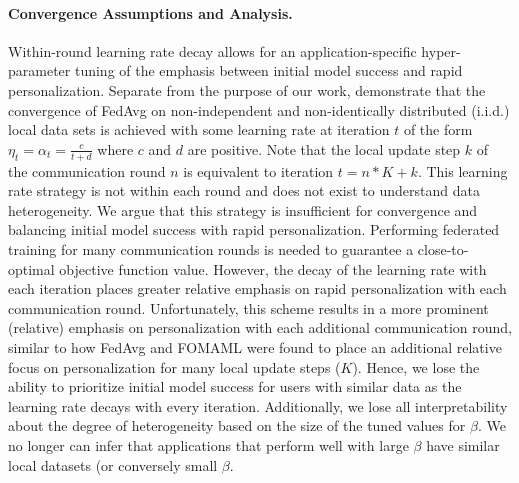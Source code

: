 \paragraph{Convergence Assumptions and Analysis.}
Within-round learning rate decay allows for an application-specific hyper-parameter tuning of the emphasis between initial model success and rapid personalization.
Separate from the purpose of our work,  \citet{fedavg-conv} demonstrate that the convergence of FedAvg on non-independent and non-identically distributed (i.i.d.) local data sets is achieved with some learning rate at iteration $t$ of the form $\eta_t = \alpha_t = \frac{c}{t + d}$ where $c$ and $d$ are positive. 
Note that the local update step $k$ of the communication round $n$ is equivalent to iteration $t = n * K + k$.
This learning rate strategy is not within each round and does not exist to understand data heterogeneity.
We argue that this strategy is insufficient for convergence and balancing initial model success with rapid personalization.
Performing federated training for many communication rounds is needed to guarantee a close-to-optimal objective function value.
However, the decay of the learning rate with each iteration places greater relative emphasis on rapid personalization with each communication round.
Unfortunately, this scheme results in a more prominent (relative) emphasis on personalization with each additional communication round, similar to how FedAvg and FOMAML were found to place an additional relative focus on personalization for many local update steps ($K$).
Hence, we lose the ability to prioritize initial model success for users with similar data as the learning rate decays with every iteration.
Additionally, we lose all interpretability about the degree of heterogeneity based on the size of the tuned values for $\beta$.
We no longer can infer that applications that perform well with large $\beta$ have similar local datasets (or conversely small $\beta$.

